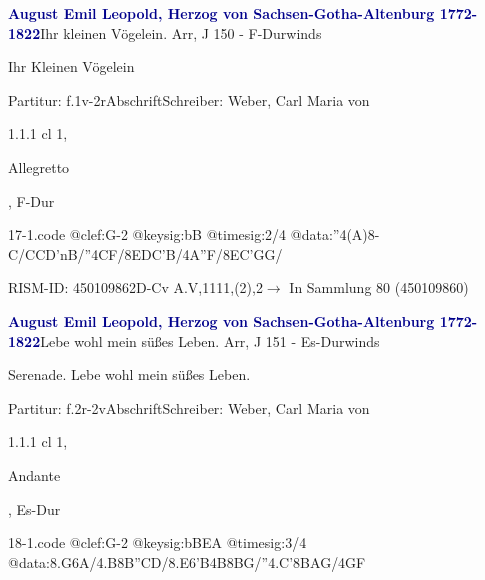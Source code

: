 \documentclass[a4paper, twocolumn, 11pt]{book}
\begin{document}
\par \vspace{16pt} \textcolor{darkblue}{\textbf{August Emil Leopold, Herzog von Sachsen-Gotha-Altenburg  1772-1822}}\hfillplus{[17]}\newline Ihr kleinen Vögelein. Arr, J 150 - F-Dur\newline winds
\par \begin{itshape} Ihr Kleinen Vögelein\end{itshape} 
\par \textcolor{darkblue}{}  Partitur: f.1v-2r\newline Abschrift\newline Schreiber: Weber, Carl Maria von
\par 1.1.1  cl 1, \begin{itshape}Allegretto\end{itshape}, F-Dur  
\begin{filecontents*}{17-1.code}
@clef:G-2
@keysig:bB
@timesig:2/4
@data:''4(A)8-C/{CCD'nB}/''4CF/{8EDC'B}/4A''F/{8EC'GG}/
\end{filecontents*}

\newline %
\par RISM-ID: 450109862\newline D-Cv  A.V,1111,(2),2\newline $\rightarrow$ In Sammlung 80 (450109860)
      
\par \vspace{16pt} \textcolor{darkblue}{\textbf{August Emil Leopold, Herzog von Sachsen-Gotha-Altenburg  1772-1822}}\hfillplus{[18]}\newline Lebe wohl mein süßes Leben. Arr, J 151 - Es-Dur\newline winds
\par \begin{itshape} Serenade. Lebe wohl mein süßes Leben.\end{itshape} 
\par \textcolor{darkblue}{}  Partitur: f.2r-2v\newline Abschrift\newline Schreiber: Weber, Carl Maria von
\par 1.1.1  cl 1, \begin{itshape}Andante\end{itshape}, Es-Dur  
\begin{filecontents*}{18-1.code}
@clef:G-2
@keysig:bBEA
@timesig:3/4
@data:{8.G6A}/4.B{8B''CD}/{8.E6'B}4B{8BG}/''4.C'{8BAG}/4GF
\end{filecontents*}
\end{document}
